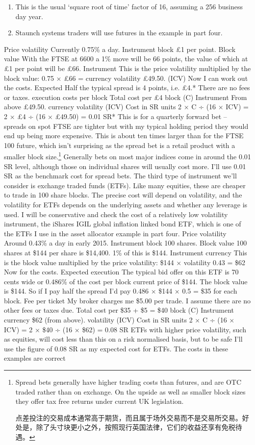 \begin{enumerate}
\item This is the usual ‘square root of time' factor of 16, assuming a 256 business day year.
\item Staunch systems traders will use futures in the example in part four. \end{enumerate}
Price volatility Currently 0.75\% a day. Instrument block £1 per point. Block value With the FTSE at 6600 a 1\% move will be 66 points, the value of which at £1 per point will be £66. Instrument This is the price volatility multiplied by the block value: 0.75 × £66 = currency volatility £49.50. (ICV) Now I can work out the costs. Expected Half the typical spread is 4 points, i.e. £4.* There are no fees or taxes. execution costs per block Total cost per £4 block (C) Instrument From above £49.50. currency volatility (ICV) Cost in SR units 2 × C ÷ (16 × ICV) = 2 × £4 ÷ (16 × £49.50) = 0.01 SR* This is for a quarterly forward bet -- spreads on spot FTSE are tighter but with my typical holding period they would end up being more expensive. This is about ten times larger than for the FTSE 100 future, which isn't surprising as the spread bet is a retail product with a smaller block size.\footnote{Spread bets generally have higher trading costs than futures, and are OTC traded rather than on exchange. On the upside as well as smaller block sizes they offer tax free returns under current UK legislation. \par 点差投注的交易成本通常高于期货，而且属于场外交易而不是交易所交易。好处是，除了头寸块更小之外，按照现行英国法律，它们的收益还享有免税待遇。} Generally bets on most major indices come in around the 0.01 SR level, although those on individual shares will usually cost more. I'll use 0.01 SR as the benchmark cost for spread bets. The third type of instrument we'll consider is exchange traded funds (ETFs). Like many equities, these are cheaper to trade in 100 share blocks. The precise cost will depend on volatility, and the volatility for ETFs depends on the underlying assets and whether any leverage is used. I will be conservative and check the cost of a relatively low volatility instrument, the iShares IGIL global inflation linked bond ETF, which is one of the ETFs I use in the asset allocator example in part four. Price volatility Around 0.43\% a day in early 2015. Instrument block 100 shares. Block value 100 shares at \$144 per share is \$14,400. 1\% of this is \$144. Instrument currency This is the block value multiplied by the price volatility: \$144 × volatility 0.43 = \$62 Now for the costs. Expected execution The typical bid offer on this ETF is 70 cents wide or 0.486\% of the cost per block current price of \$144. The block value is \$144. So if I pay half the spread I'd pay 0.486 × \$144 × 0.5 = \$35 for each block. Fee per ticket My broker charges me \$5.00 per trade. I assume there are no other fees or taxes due. Total cost per \$35 + \$5 = \$40 block (C) Instrument currency \$62 (from above). volatility (ICV) Cost in SR units 2 × C ÷ (16 × ICV) = 2 × \$40 ÷ (16 × \$62) = 0.08 SR ETFs with higher price volatility, such as equities, will cost less than this on a risk normalised basis, but to be safe I'll use the figure of 0.08 SR as my expected cost for ETFs. The costs in these examples are correct 